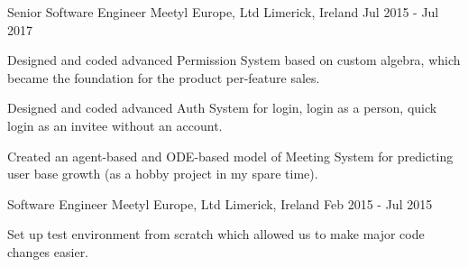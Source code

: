 \begin{cventries}
    \cventry
    {Senior Software Engineer} %
    {Meetyl Europe, Ltd} %
    {Limerick, Ireland} %
    {Jul 2015 - Jul 2017} %
    {
      \begin{cvitems} %
        \item {Designed and coded advanced Permission System based on custom algebra, which became the foundation for the product per-feature sales.}
        \item {Designed and coded advanced Auth System for login, login as a person, quick login as an invitee without an account.}
        \item {Created an agent-based and ODE-based model of Meeting System for predicting user base growth (as a hobby project in my spare time).}
      \end{cvitems}
    }

    \cventry
    {Software Engineer} %
    {Meetyl Europe, Ltd} %
    {Limerick, Ireland} %
    {Feb 2015 - Jul 2015} %
    {
      \begin{cvitems} %
        \item {Set up test environment from scratch which allowed us to make major code changes easier.}
      \end{cvitems}
    }


\end{cventries}
